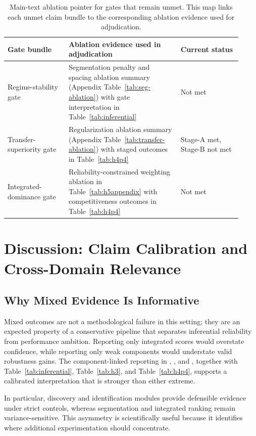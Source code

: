 \documentclass{article} %
\begin{document}
\begin{table}[t]
\caption{Main-text ablation pointer for gates that remain unmet. This map links each unmet claim bundle to the corresponding ablation evidence used for adjudication.}
\label{tab:ablation-map}
\centering
\small
\renewcommand{\arraystretch}{1.1}
\setlength{\tabcolsep}{4pt}
\begin{tabular}{p{0.24\linewidth}p{0.44\linewidth}p{0.24\linewidth}}
\hline
Gate bundle & Ablation evidence used in adjudication & Current status \\
\hline
Regime-stability gate & Segmentation penalty and spacing ablation summary (Appendix Table~\ref{tab:seg-ablation}) with gate interpretation in Table~\ref{tab:inferential} & Not met \\
Transfer-superiority gate & Regularization ablation summary (Appendix Table~\ref{tab:transfer-ablation}) with staged outcomes in Table~\ref{tab:h4p4} & Stage-A met, Stage-B not met \\
Integrated-dominance gate & Reliability-constrained weighting ablation in Table~\ref{tab:h5appendix} with competitiveness outcomes in Table~\ref{tab:h4p4} & Not met \\
\hline
\end{tabular}
\end{table}

\section{Discussion: Claim Calibration and Cross-Domain Relevance}\label{sec:discussion}
\subsection{Why Mixed Evidence Is Informative}
Mixed outcomes are not a methodological failure in this setting; they are an expected property of a conservative pipeline that separates inferential reliability from performance ambition. Reporting only integrated scores would overstate confidence, while reporting only weak components would understate valid robustness gains. The component-linked reporting in , , and , together with Table~\ref{tab:inferential}, Table~\ref{tab:h3}, and Table~\ref{tab:h4p4}, supports a calibrated interpretation that is stronger than either extreme.

In particular, discovery and identification modules provide defensible evidence under strict controls, whereas segmentation and integrated ranking remain variance-sensitive. This asymmetry is scientifically useful because it identifies where additional experimentation should concentrate.
\end{document}
